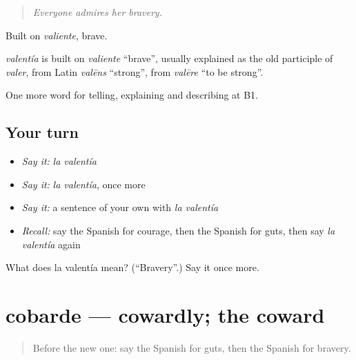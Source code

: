 \begin{quote}
\emph{Everyone admires her bravery.}
\end{quote}

Built on \emph{valiente}, brave.

\begin{cousinweb}
\emph{valentía} is built on \emph{valiente} \textquotedblleft{}brave\textquotedblright{}, usually explained as the old participle of \emph{valer}, from Latin \emph{valēns} \textquotedblleft{}strong\textquotedblright{}, from \emph{valēre} \textquotedblleft{}to be strong\textquotedblright{}.
\end{cousinweb}

\begin{grammarlens}[title={What you've built}]
One more word for telling, explaining and describing at B1.
\end{grammarlens}

\subsection*{Your turn}
\begin{itemize}
\raggedright
  \item \emph{Say it:} \emph{la valentía}
  \item \emph{Say it:} \emph{la valentía}, once more
  \item \emph{Say it:} a sentence of your own with \emph{la valentía}
  \item \emph{Recall:} say the Spanish for courage, then the Spanish for guts, then say \emph{la valentía} again
\end{itemize}

\begin{tcolorbox}[breakable,colback=teal!4,colframe=teal!35!black,title={Before you move on}]
What does la valentía mean? (\textquotedblleft{}Bravery\textquotedblright{}.) Say it once more.
\end{tcolorbox}
\section[cobarde]{cobarde — cowardly; the coward}

\label{lesson:ES-C722-cobarde}



\begin{quote}
Before the new one: say the Spanish for guts, then the Spanish for bravery.
\end{quote}

